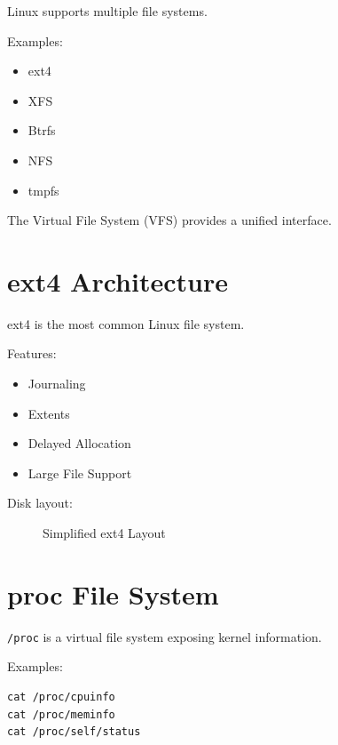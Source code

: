 Linux supports multiple file systems.

Examples:

\begin{itemize}
\item ext4
\item XFS
\item Btrfs
\item NFS
\item tmpfs
\end{itemize}

The Virtual File System (VFS) provides a unified interface.

\section{ext4 Architecture}

ext4 is the most common Linux file system.

Features:

\begin{itemize}
\item Journaling
\item Extents
\item Delayed Allocation
\item Large File Support
\end{itemize}

Disk layout:

\begin{figure}[H]
\centering
{}
\caption{Simplified ext4 Layout}
\end{figure}

\section{proc File System}

\texttt{/proc} is a virtual file system exposing kernel information.

Examples:

\begin{lstlisting}[style=interviewcode]
cat /proc/cpuinfo
cat /proc/meminfo
cat /proc/self/status
\end{lstlisting}

